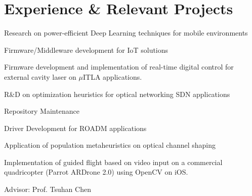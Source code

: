 \documentclass[]{deedy-resume-openfont}
\begin{document}
\begin{minipage}[t]{0.66\textwidth} 


\section{Experience \& Relevant Projects}
\vspace{\topsep} %
\begin{tightemize}
	\item Research on power-efficient Deep Learning techniques for mobile environments
	\item Firmware/Middleware development for IoT solutions
	\item Firmware development and implementation of real-time digital control for external cavity laser on $\mu$ITLA applications.
	\item R\&D on optimization heuristics for optical networking SDN applications \cite{assine2016sdn, cognitive_cpqd}
	\item Repository Maintenance
	
	
\end{tightemize}
\sectionsep

\begin{tightemize}
	\item Driver Development for ROADM applications
	\item Application of population metaheuristics on optical channel shaping \cite{de2015embedded}
\end{tightemize}
\sectionsep

\begin{tightemize}
	\item Implementation of guided flight based on video input on a commercial quadricopter (Parrot ARDrone 2.0) using OpenCV on iOS. 
	\item Advisor: Prof. Tsuhan Chen
\end{tightemize}
\sectionsep



\end{minipage}
\end{document}
